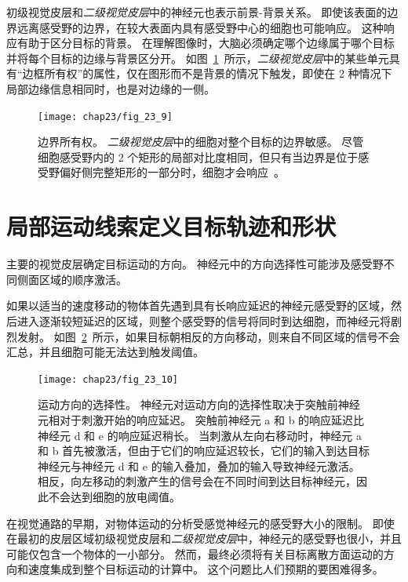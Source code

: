 初级视觉皮层和\textit{二级视觉皮层}中的神经元也表示前景-背景关系。
即使该表面的边界远离感受野的边界，在较大表面内具有感受野中心的细胞也可能响应。
这种响应有助于区分目标的背景。
在理解图像时，大脑必须确定哪个边缘属于哪个目标并将每个目标的边缘与背景区分开。
如图~\ref{fig:23_9}~所示，\textit{二级视觉皮层}中的某些单元具有“边框所有权”的属性，仅在图形而不是背景的情况下触发，即使在 2 种情况下局部边缘信息相同时，也是对边缘的一侧。


\begin{figure}[htbp]
	\centering
	\texttt{[image: chap23/fig\_23\_9]}
	\caption{边界所有权。
		\textit{二级视觉皮层}中的细胞对整个目标的边界敏感。
		尽管细胞感受野内的 2 个矩形的局部对比度相同，但只有当边界是位于感受野偏好侧完整矩形的一部分时，细胞才会响应~\cite{zhou2000coding}。}
	\label{fig:23_9}
\end{figure}



\section{局部运动线索定义目标轨迹和形状}

主要的视觉皮层确定目标运动的方向。
神经元中的方向选择性可能涉及感受野不同侧面区域的顺序激活。


如果以适当的速度移动的物体首先遇到具有长响应延迟的神经元感受野的区域，然后进入逐渐较短延迟的区域，则整个感受野的信号将同时到达细胞，而神经元将剧烈发射。
如图~\ref{fig:23_10}~所示，如果目标朝相反的方向移动，则来自不同区域的信号不会汇总，并且细胞可能无法达到触发阈值。


\begin{figure}[htbp]
	\centering
	\texttt{[image: chap23/fig\_23\_10]}
	\caption{运动方向的选择性。
		神经元对运动方向的选择性取决于突触前神经元相对于刺激开始的响应延迟。
		突触前神经元 a 和 b 的响应延迟比神经元 d 和 e 的响应延迟稍长。
		当刺激从左向右移动时，神经元 a 和 b 首先被激活，但由于它们的响应延迟较长，它们的输入到达目标神经元与神经元 d 和 e 的输入叠加，叠加的输入导致神经元激活。
		相反，向左移动的刺激产生的信号会在不同时间到达目标神经元，因此不会达到细胞的放电阈值\cite{priebe2008inhibition}。}
	\label{fig:23_10}
\end{figure}


在视觉通路的早期，对物体运动的分析受感觉神经元的感受野大小的限制。
即使在最初的皮层区域初级视觉皮层和\textit{二级视觉皮层}中，神经元的感受野也很小，并且可能仅包含一个物体的一小部分。
然而，最终必须将有关目标离散方面运动的方向和速度集成到整个目标运动的计算中。 
这个问题比人们预期的要困难得多。


